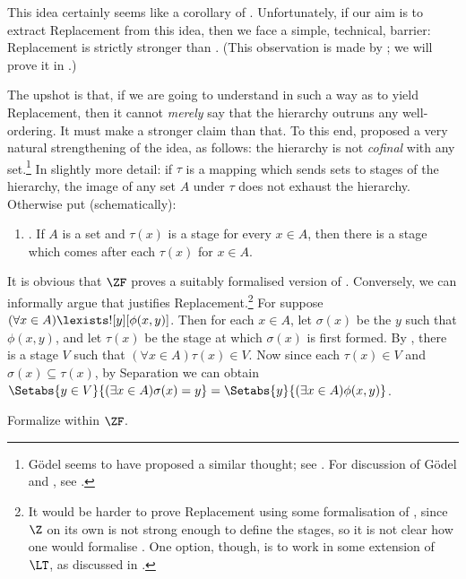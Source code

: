 \documentclass[../../../include/open-logic-section]{subfiles}
\begin{document}
This idea certainly seems like a corollary of \stagesinex.
Unfortunately, if our aim is to extract Replacement from this idea,
then we face a simple, technical, barrier: Replacement is strictly stronger than
. (This observation is made by 
\citet[\S13.2]{Potter2004}; we will prove it in .)

The upshot is that, if we are going to understand \stagesinex{} in
such a way as to yield Replacement, then it cannot \emph{merely} say
that the hierarchy outruns any well-ordering. It must make a stronger
claim than that. To this end, \cite{Shoenfield:AST} proposed a very
natural strengthening of the idea, as follows: the hierarchy is not
\emph{cofinal} with any set.\footnote{G\"odel seems to have proposed a
similar thought; see \citet[p.~223]{Potter2004}. For discussion of G\"odel and \citeauthor{Shoenfield:AST}, see \citet[90--5]{Incurvati2020}.} In slightly more detail:
if $\tau$ is a mapping which sends sets to stages of the hierarchy,
the image of any set $A$ under $\tau$ does not exhaust the hierarchy.
Otherwise put (schematically): 
\begin{enumerate}
	\item[] \stagescofin. If $A$ is a set and $\tau(x)$ is a stage for
	every $x \in A$, then there is a stage which comes after each
	$\tau(x)$ for $x \in A$.
\end{enumerate}
It is obvious that $\ZF$ proves a suitably formalised version of
\stagescofin. Conversely, we can informally argue that \stagescofin{}
justifies Replacement.\footnote{It would be harder to prove
Replacement using some formalisation of \stagescofin, since $\Z$ on
its own is not strong enough to define the stages, so it is not clear
how one would formalise \stagescofin. One option, though, is to
work in some extension of $\LT$, as discussed in .} For suppose $(\forall x \in A)\lexists![y][\phi(x,y)]$. Then for each $x \in A$, let $\sigma(x)$ be the $y$ such
that $\phi(x,y)$, and let $\tau(x)$ be the stage at which $\sigma(x)$
is first formed. By \stagescofin, there is a stage $V$ such that
$(\forall x \in A)\tau(x)\in V$. Now since each $\tau(x) \in V$ and
$\sigma(x) \subseteq \tau(x)$, by Separation we can obtain $\Setabs{y
\in V}{(\exists x \in A)\sigma(x) = y} = \Setabs{y}{(\exists x \in
A)\phi(x,y)}$.

\begin{prob}
	Formalize \stagescofin{} within $\ZF$.
\end{prob}
\end{document}
